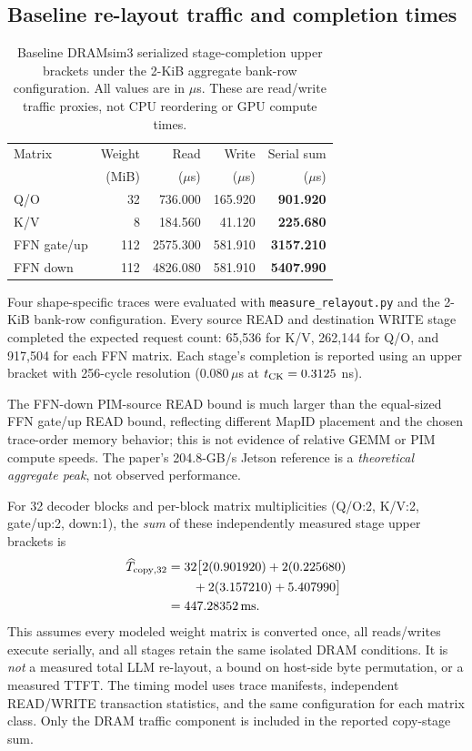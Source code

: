 \documentclass[conference,10pt]{IEEEtran}
\begin{document}
\subsection{Baseline re-layout traffic and completion times}
\begin{table}[t]
\caption{Baseline DRAMsim3 serialized stage-completion upper
brackets under the 2-KiB aggregate bank-row configuration.
All values are in $\mu$s. These are read/write traffic proxies, not CPU
reordering or GPU compute times.}
\label{tab:copy}
\centering\footnotesize
\begin{tabular}{@{}lrrrr@{}}
\toprule
Matrix & Weight & Read & Write & Serial sum \\
 & (MiB) & ($\mu$s) & ($\mu$s) & ($\mu$s) \\
\midrule
Q/O & 32 & 736.000 & 165.920 & \textbf{901.920} \\
K/V & 8 & 184.560 & 41.120 & \textbf{225.680} \\
FFN gate/up & 112 & 2575.300 & 581.910 & \textbf{3157.210} \\
FFN down & 112 & 4826.080 & 581.910 & \textbf{5407.990} \\
\bottomrule
\end{tabular}
\end{table}

Four shape-specific traces were evaluated with
\texttt{measure\_relayout.py} and the 2-KiB bank-row configuration.
Every source READ and destination WRITE stage completed the expected
request count: 65,536 for K/V, 262,144 for Q/O, and 917,504 for
each FFN matrix. Each stage's completion is reported using an
upper bracket with 256-cycle resolution
($0.080\,\mu$s at $t_{\rm CK}=0.3125$ ns).

The FFN-down PIM-source READ bound is much larger than the equal-sized
FFN gate/up READ bound, reflecting different MapID placement and the
chosen trace-order memory behavior; this is not evidence of relative
GEMM or PIM compute speeds. The paper's 204.8-GB/s Jetson reference
is a \emph{theoretical aggregate peak}, not observed performance.

For 32 decoder blocks and per-block matrix multiplicities
(Q/O:2, K/V:2, gate/up:2, down:1), the \emph{sum} of these
independently measured stage upper brackets is
\begin{align}
\widehat T_{\rm copy,32}
&= 32\big[2(0.901920)+2(0.225680)\notag\\
&\qquad +2(3.157210)+5.407990\big]\notag\\
&=447.28352\,\mathrm{ms}.
\label{eq:copyfull}
\end{align}
This assumes every modeled weight matrix is converted once, all
reads/writes execute serially, and all stages retain the same
isolated DRAM conditions. It is \emph{not} a measured total LLM
re-layout, a bound on host-side byte permutation, or a measured TTFT.
The timing model uses trace manifests, independent READ/WRITE
transaction statistics, and the same configuration for each matrix
class. Only the DRAM traffic component is included in the reported
copy-stage sum.
\end{document}
